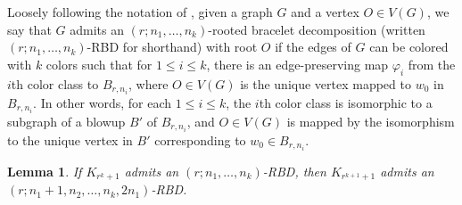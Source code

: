\documentclass[reqno]{amsart}
\newtheorem{lemma}[theorem]{Lemma}
\theoremstyle{remark}
\theoremstyle{definition}
\numberwithin{theorem}{section}
\renewcommand{\phi}{\varphi}
\renewcommand{\le}{\leqslant}
\begin{document}
Loosely following the notation of \cite{DayJohnson2017MulticolourRamseyOddCycles}, given a graph $G$ and a vertex $O\in V(G)$, we say that $G$ admits an $(r;n_1,\dots,n_k)$-rooted bracelet decomposition (written $(r;n_1,\dots,n_k)$-RBD for shorthand) with root $O$ if the edges of $G$ can be colored with $k$ colors such that for $1\le i\le k$, there is an edge-preserving map $\phi_i$ from the $i$th color class to $B_{r,n_i}$, where $O\in V(G)$ is the unique vertex mapped to $w_0$ in $B_{r,n_i}$. In other words, for each $1\le i\le k$, the $i$th color class is isomorphic to a subgraph of a blowup $B'$ of $B_{r,n_i}$, and $O\in V(G)$ is mapped by the isomorphism to the unique vertex in $B'$ corresponding to $w_0\in B_{r,n_i}$.

\begin{lemma}\label{lem:induct}
    If $K_{r^k+1}$ admits an $(r;n_1,\dots,n_k)$-RBD, then $K_{r^{k+1}+1}$ admits an $(r;n_1+1,n_2,\dots,n_k,2n_1)$-RBD.
\end{lemma}
\end{document}
